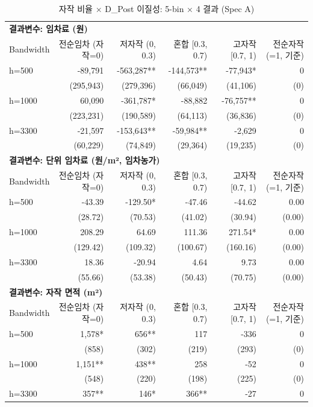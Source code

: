 \begin{table}[t]
\centering
\caption{자작 비율 × D\_Post 이질성: 5-bin × 4 결과 (Spec A)}
\label{tab:het_own_share_ko}
\begin{tabular}{lrrrrr}
\toprule
\multicolumn{6}{l}{\textbf{결과변수: 임차료 (원)}} \\
Bandwidth & 전순임차 (자작=0) & 저자작 (0, 0.3) & 혼합 [0.3, 0.7) & 고자작 [0.7, 1) & 전순자작 (=1, 기준) \\
\midrule
h=500 & -89,791 & -563,287** & -144,573** & -77,943* & 0 \\
    & (295,943) & (279,396) & (66,049) & (41,106) & (0) \\
h=1000 & 60,090 & -361,787* & -88,882 & -76,757** & 0 \\
    & (223,231) & (190,589) & (64,113) & (36,836) & (0) \\
h=3300 & -21,597 & -153,643** & -59,984** & -2,629 & 0 \\
    & (60,229) & (74,849) & (29,364) & (19,235) & (0) \\
\midrule
\multicolumn{6}{l}{\textbf{결과변수: 단위 임차료 (원/m², 임차농가)}} \\
Bandwidth & 전순임차 (자작=0) & 저자작 (0, 0.3) & 혼합 [0.3, 0.7) & 고자작 [0.7, 1) & 전순자작 (=1, 기준) \\
\midrule
h=500 & -43.39 & -129.50* & -47.46 & -44.62 & 0.00 \\
    & (28.72) & (70.53) & (41.02) & (30.94) & (0.00) \\
h=1000 & 208.29 & 64.69 & 111.36 & 271.54* & 0.00 \\
    & (129.42) & (109.32) & (100.67) & (160.16) & (0.00) \\
h=3300 & 18.36 & -20.94 & 4.64 & 9.73 & 0.00 \\
    & (55.66) & (53.38) & (50.43) & (70.75) & (0.00) \\
\midrule
\multicolumn{6}{l}{\textbf{결과변수: 자작 면적 (m²)}} \\
Bandwidth & 전순임차 (자작=0) & 저자작 (0, 0.3) & 혼합 [0.3, 0.7) & 고자작 [0.7, 1) & 전순자작 (=1, 기준) \\
\midrule
h=500 & 1,578* & 656** & 117 & -336 & 0 \\
    & (858) & (302) & (219) & (293) & (0) \\
h=1000 & 1,151** & 438** & 258 & -52 & 0 \\
    & (548) & (220) & (198) & (225) & (0) \\
h=3300 & 357** & 146* & 366** & -27 & 0 \\

\end{tabular}
\end{table}
